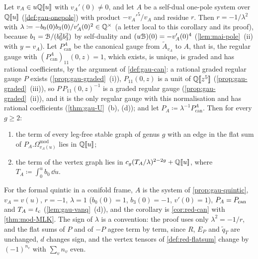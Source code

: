 \begin{cor}
\label{cor:mai-univ}
Let $v_A\in u\mathbb{Q}[\![ u ]\!]$ with $v_A'(0)\neq0$, and let $A$ be a self-dual one-pole system over $\mathbb{Q}[\![ u ]\!]$ (\cref{def:gau-onepole}) with product $-v_A'^5/v_A$ and residue $r$. Then $r=-1/\lambda^2$ with $\lambda\coloneqq-b_0(0)b_3(0)/v_A'(0)^2\in\mathbb{Q}^\times$ (a letter local to this corollary and its proof), because $b_1=\mathcal{B}/(b_0^2b_3^2)$ by self-duality and $(u\mathcal{B})(0)=-v_A'(0)^4$ (\cref{lem:mai-pole}~(ii) with $y=v_A$). Let $P^A_{\mathrm{can}}$ be the canonical gauge from $\tilde A_{v_A}$ to $A$, that is, the regular gauge with $(P^A_{\mathrm{can}})_{11}(0,z)=1$, which exists, is unique, is graded and has rational coefficients, by the argument of \cref{def:gau-can}: a rational graded regular gauge $P$ exists (\cref{prop:gau-graded}~(i)), $P_{11}(0,z)$ is a unit of $\mathbb{Q}[\![ z^5 ]\!]$ (\cref{prop:gau-graded}~(iii)), so $P\,P_{11}(0,z)^{-1}$ is a graded regular gauge (\cref{prop:gau-graded}~(ii)), and it is the only regular gauge with this normalisation and has rational coefficients (\cref{thm:gau-U}~(b), (d)); and let $P_A\coloneqq\lambda^{-1}P^A_{\mathrm{can}}$. Then for every $g\geq2$:
\begin{enumerate}
\item the term of every leg-free stable graph of genus $g$ with an edge in the flat sum of $P_A.\Omega^{\mathrm{mod}}_{v_A(u)}$ lies in $\mathbb{Q}[\![ u ]\!]$;
\item the term of the vertex graph lies in $c_g(T_A/\lambda)^{2-2g}+\mathbb{Q}[\![ u ]\!]$, where $T_A\coloneqq\int_0^ub_0\,\dd u$.
\end{enumerate}
\end{cor}

For the formal quintic in a conifold frame, $A$ is the system of \cref{prop:gau-quintic}, $v_A=v(u)$, $r=-1$, $\lambda=1$ ($b_0(0)=1$, $b_3(0)=-1$, $v'(0)=1$), $P_A=P_{\mathrm{can}}$ and $T_A=t_{\mathrm{c}}$ (\cref{lem:gau-vanq}~(d)), and the corollary is \cref{cor:red-can} with \cref{thm:mod-MLK}. The sign of $\lambda$ is a convention: the proof uses only $\lambda^2=-1/r$, and the flat sums of $P$ and of $-P$ agree term by term, since $R$, $E_P$ and $\tilde q_T$ are unchanged, $d$ changes sign, and the vertex tensors of \cref{def:red-flatsum} change by $(-1)^{n_v}$ with $\sum_vn_v$ even.

